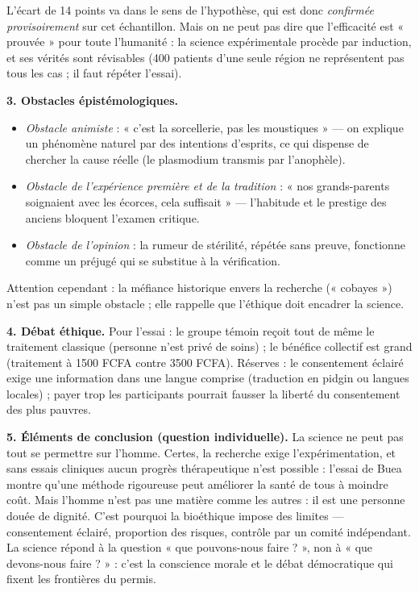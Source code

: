 \documentclass[11pt]{article}
\begin{document}
\begin{exoresolu}
L'écart de 14 points va dans le sens de l'hypothèse, qui est donc \emph{confirmée provisoirement} sur cet échantillon. Mais on ne peut pas dire que l'efficacité est « prouvée » pour toute l'humanité : la science expérimentale procède par induction, et ses vérités sont révisables (400 patients d'une seule région ne représentent pas tous les cas ; il faut répéter l'essai).

\textbf{3. Obstacles épistémologiques.}
\begin{itemize}
\item \emph{Obstacle animiste} : « c'est la sorcellerie, pas les moustiques » — on explique un phénomène naturel par des intentions d'esprits, ce qui dispense de chercher la cause réelle (le plasmodium transmis par l'anophèle).
\item \emph{Obstacle de l'expérience première et de la tradition} : « nos grands-parents soignaient avec les écorces, cela suffisait » — l'habitude et le prestige des anciens bloquent l'examen critique.
\item \emph{Obstacle de l'opinion} : la rumeur de stérilité, répétée sans preuve, fonctionne comme un préjugé qui se substitue à la vérification.
\end{itemize}
Attention cependant : la méfiance historique envers la recherche (« cobayes ») n'est pas un simple obstacle ; elle rappelle que l'éthique doit encadrer la science.

\textbf{4. Débat éthique.} Pour l'essai : le groupe témoin reçoit tout de même le traitement classique (personne n'est privé de soins) ; le bénéfice collectif est grand (traitement à \num{1500} FCFA contre \num{3500} FCFA). Réserves : le consentement éclairé exige une information dans une langue comprise (traduction en pidgin ou langues locales) ; payer trop les participants pourrait fausser la liberté du consentement des plus pauvres.

\textbf{5. Éléments de conclusion (question individuelle).} La science ne peut pas tout se permettre sur l'homme. Certes, la recherche exige l'expérimentation, et sans essais cliniques aucun progrès thérapeutique n'est possible : l'essai de Buea montre qu'une méthode rigoureuse peut améliorer la santé de tous à moindre coût. Mais l'homme n'est pas une matière comme les autres : il est une personne douée de dignité. C'est pourquoi la bioéthique impose des limites — consentement éclairé, proportion des risques, contrôle par un comité indépendant. La science répond à la question « que pouvons-nous faire ? », non à « que devons-nous faire ? » : c'est la conscience morale et le débat démocratique qui fixent les frontières du permis.
\end{exoresolu}
\end{document}
